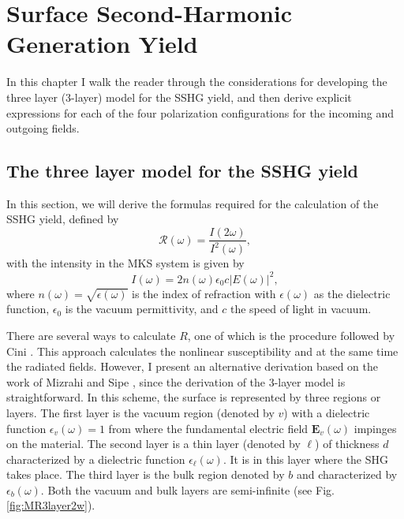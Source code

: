 \chapter{Surface Second-Harmonic Generation Yield}
\minitoc

In this chapter I walk the reader through the considerations for developing the
three layer (3-layer) model for the SSHG yield, and then derive explicit
expressions for each of the four polarization configurations for the incoming
and outgoing fields.



\section{The three layer model for the SSHG yield}

In this section, we will derive the formulas required for the calculation of the
SSHG yield, defined by
\begin{equation}\label{eq:uno}
\mathcal{R}(\omega)=\frac{I(2\omega)}{I^2(\omega)},
\end{equation}
with the intensity in the MKS system is given by \cite{boyd, sutherland}
\begin{equation}\label{eq:dos}
I(\omega)=2n(\omega)\epsilon_{0}c|E(\omega)|^2,
\end{equation}
where $n(\omega)=\sqrt{\epsilon(\omega)}$ is the index of refraction with
$\epsilon(\omega)$ as the dielectric function, $\epsilon_{0}$ is the vacuum
permittivity, and $c$ the speed of light in vacuum.

There are several ways to calculate $R$, one of which is the procedure followed
by Cini \cite{ciniPRB91}. This approach calculates the nonlinear susceptibility
and at the same time the radiated fields. However, I present an alternative
derivation based on the work of Mizrahi and Sipe \cite{mizrahiJOSA88}, since the
derivation of the 3-layer model is straightforward. In this scheme, the surface
is represented by three regions or layers. The first layer is the vacuum region
(denoted by $v$) with a dielectric function $\epsilon_{v}(\omega)=1$ from where
the fundamental electric field $\mathbf{E}_{v}(\omega)$ impinges on the
material. The second layer is a thin layer (denoted by $\ell$) of thickness $d$
characterized by a dielectric function $\epsilon_{\ell}(\omega)$. It is in this
layer where the SHG takes place. The third layer is the bulk region denoted by
$b$ and characterized by $\epsilon_{b}(\omega)$. Both the vacuum and bulk layers
are semi-infinite (see Fig. \ref{fig:MR3layer2w}).


